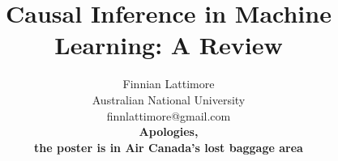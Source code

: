\documentclass[20pt]{extreport}
\title{Causal Inference in Machine Learning: A Review}
\author{Finnian Lattimore\\ Australian National University\\finnlattimore@gmail.com\\\textbf{Apologies,}\\ \textbf{the poster is in Air Canada's lost baggage area} }
\begin{document}
\def\ci{\perp\!\!\!\perp}
\maketitle









\end{document}
